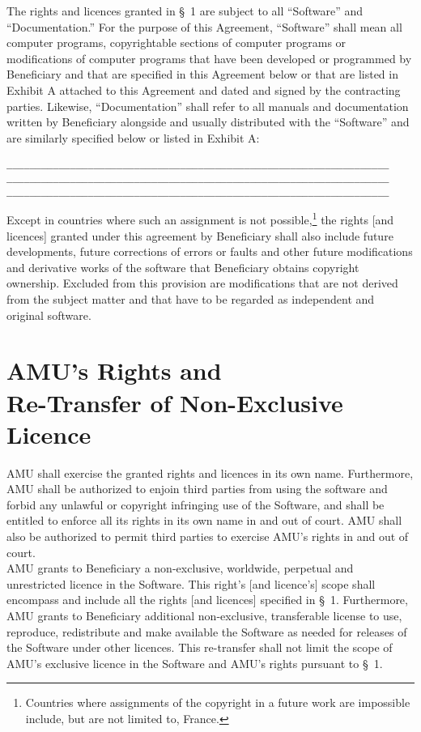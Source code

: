 The rights and licences granted in {\S}~1 are subject to all
``Software'' and ``Documentation.'' For the purpose of this Agreement,
``Software'' shall mean all computer programs, copyrightable sections
of computer programs or modifications of computer programs that have
been developed or programmed by Beneficiary and that are specified in
this Agreement below or that are listed in Exhibit A attached to this
Agreement and dated and signed by the contracting parties. Likewise,
``Documentation'' shall refer to all manuals and documentation written
by Beneficiary alongside and usually distributed with the ``Software''
and are similarly specified below or listed in Exhibit A:
\begin{alltt}
    __________________________________________________________________
    __________________________________________________________________
    __________________________________________________________________
\end{alltt}
Except in countries where such an assignment is not
possible,\footnote{Countries where assignments of the copyright in a
future work are impossible include, but are not limited to, France.}
the rights [and licences] granted under this agreement by Beneficiary
shall also include future developments, future corrections of errors
or faults and other future modifications and derivative works of the
software that Beneficiary obtains copyright ownership.  Excluded from
this provision are modifications that are not derived from the subject
matter and that have to be regarded as independent and original
software. 

\section{AMU's Rights and \\Re-Transfer of Non-Exclusive Licence}
\A AMU shall exercise the granted rights and licences in its
own name. Furthermore, AMU shall be authorized to enjoin third
parties from using the software and forbid any unlawful or copyright
infringing use of the Software, and shall be entitled to enforce all
its rights in its own name in and out of court. AMU shall also
be authorized to permit third parties to exercise AMU's rights
in and out of court.\\ 

\A AMU grants to Beneficiary a non-exclusive, worldwide, perpetual
and unrestricted licence in the Software. This right's [and licence's]
scope shall encompass and include all the rights [and licences]
specified in {\S}~1. Furthermore, AMU grants to Beneficiary
additional non-exclusive, transferable license to use, reproduce,
redistribute and make available the Software as needed for releases of
the Software under other licences.  This re-transfer shall not limit
the scope of AMU's exclusive licence in the Software and AMU's
rights pursuant to {\S}~1.\\

